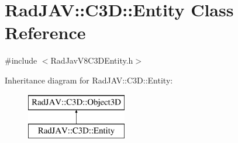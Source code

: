 \hypertarget{class_rad_j_a_v_1_1_c3_d_1_1_entity}{}\section{Rad\+J\+AV\+:\+:C3D\+:\+:Entity Class Reference}
\label{class_rad_j_a_v_1_1_c3_d_1_1_entity}


{\ttfamily \#include $<$Rad\+Jav\+V8\+C3\+D\+Entity.\+h$>$}

Inheritance diagram for Rad\+J\+AV\+:\+:C3D\+:\+:Entity\+:\begin{figure}[H]
\begin{center}
\leavevmode
\includegraphics[height=2.000000cm]{class_rad_j_a_v_1_1_c3_d_1_1_entity}
\end{center}
\end{figure}
